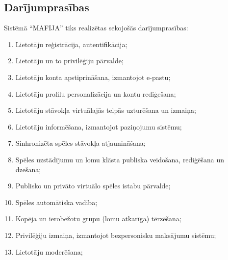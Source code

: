 \subsection{Darījumprasības}
Sistēmā ``MAFIJA'' tiks  realizētas sekojošās darījumprasības:
\begin{enumerate}
	\item Lietotāju reģistrācija, autentifikācija;
	\item Lietotāju un to privilēģiju pārvalde;
	\item Lietotāju konta apstiprināšana, izmantojot e-pastu;
	\item Lietotāju profilu personalizācija un kontu rediģešana;
	\item Lietotāju stāvokļa virtuālajās telpās uzturēšana un izmaiņa;
	\item Lietotāju informēšana, izmantojot paziņojumu sistēmu;
	\item Sinhronizēta spēles stāvokļa atjaunināšana;
	\item Spēles uzstādījumu un lomu klāsta publiska veidošana, rediģēšana un dzēšana;
	\item Publisko un privāto virtuālo spēles istabu pārvalde;
	\item Spēles automātiska vadība;
	\item Kopēja un ierobežotu grupu (lomu atkarīga) tērzēšana;
	\item Privilēģiju izmaiņa, izmantojot bezpersonisku maksājumu sistēmu;
	\item Lietotāju moderēšana;
\end{enumerate}
